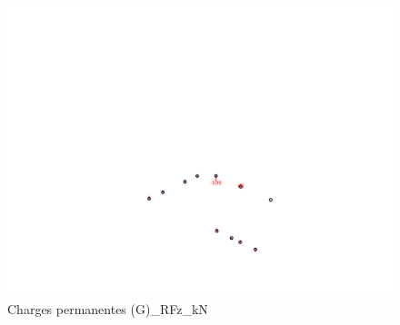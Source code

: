     \begin{figure}[H] %
        \centering %
        \includegraphics[width=\textwidth]{assets/img/graph3D_charges_cas_6_RFz_kN.png} %
        \caption{Charges permanentes (G)\_RFz\_kN} %
    \end{figure}

    